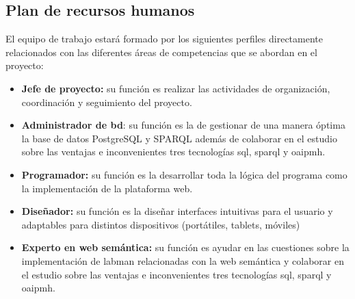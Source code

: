 \subsection{Plan de recursos humanos}\label{sec:planRecursosHumanos}

El equipo de trabajo estará formado por los siguientes perfiles directamente relacionados con las diferentes áreas de competencias que se abordan en el proyecto: 

\begin{itemize}
	\item \textbf{Jefe de proyecto:} su función es realizar las actividades de organización, coordinación y seguimiento del proyecto.
	\item \textbf{Administrador de \acrlong{bd}}: su función es la de gestionar de una manera óptima la base de datos PostgreSQL y SPARQL además de colaborar en el estudio sobre las ventajas e inconvenientes tres tecnologías \acrshort{sql}, \acrshort{sparql} y \acrshort{oaipmh}. 
	\item \textbf{Programador:} su función es la desarrollar toda la lógica del programa como la implementación de la plataforma web. 
	\item \textbf{Diseñador:} su función es la diseñar interfaces intuitivas para el usuario y adaptables para distintos dispositivos (portátiles, tablets, móviles) 
	\item \textbf{Experto en web semántica:} su función es ayudar en las cuestiones sobre la implementación de \acrshort{labman} relacionadas con la web semántica y colaborar en el estudio sobre las ventajas e inconvenientes tres tecnologías \acrshort{sql}, \acrshort{sparql} y \acrshort{oaipmh}.
\end{itemize}
